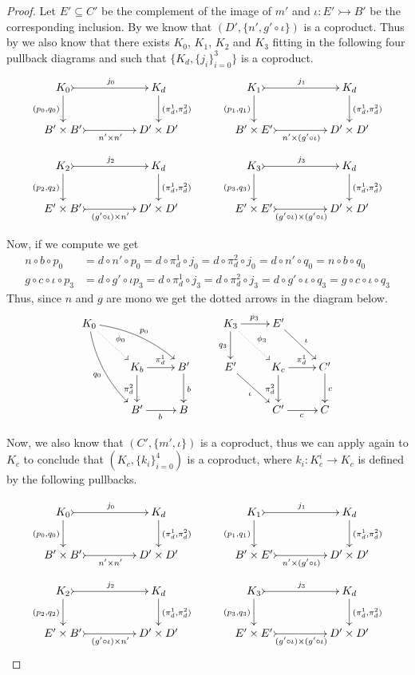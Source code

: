 \documentclass[a4paper,UKenglish,cleveref,pdftex,thm-restate,numberwithinsect]{lipics-v2021}
\newcommand{\mto}{\rightarrowtail}
\begin{document}
\begin{proof}
		Let $E'\subseteq C'$ be the complement of the image of $m'$ and $\iota\colon E'\mto B'$ be the corresponding inclusion. By  we know that $(D', \{n', g'\circ \iota\})$ is a coproduct. Thus by  we also know that there exists $K_0$, $K_1$, $K_2$ and $K_3$ fitting in the following four pullback diagrams and such that $\{K_d, \{j_i\}_{i=0}^3\}$ is a coproduct.
	\[\xymatrix@C=45pt{K_0 \ar@{>->}[r]^{j_0}  \ar[d]_{(p_0, q_0)}& K_d   \ar[d]^{(\pi^1_d, \pi^2_d)}& K_1 \ar@{>->}[r]^{j_1}  \ar[d]_{(p_1, q_1)} & K_d \ar[d]^{(\pi^1_d, \pi^2_d)} \\
		B'\times B' \ar@{>->}[r]_-{n'\times n'} & D'\times D' & B'\times E' \ar@{>->}[r]_-{n'\times (g'\circ \iota)} & D'\times D'}\]
	\[ \xymatrix@C=45pt{K_2 \ar@{>->}[r]^{j_2}  \ar[d]_{(p_2, q_2)}& K_d   \ar[d]^{(\pi^1_d, \pi^2_d)}& K_3 \ar@{>->}[r]^{j_3}  \ar[d]_{(p_3, q_3)} & K_d \ar[d]^{(\pi^1_d, \pi^2_d)} \\
		E'\times B' \ar@{>->}[r]_-{(g'\circ \iota) \times n'} & D'\times D' & E'\times E' \ar@{>->}[r]_-{(g'\circ \iota)\times (g'\circ \iota)} & D'\times D'}\]
	
	Now, if we compute we get
	\begin{align*}
		n\circ b\circ p_0&= d\circ n'\circ p_0= d\circ \pi^1_d\circ j_0=d\circ \pi^2_d\circ j_0=d\circ n'\circ q_0=n\circ b\circ q_0\\
g\circ c \circ  \iota \circ p_3&=d\circ g' \circ  \iota p_3=d\circ \pi^1_d\circ j_3=d\circ \pi^2_d\circ j_3=d\circ g'\circ \iota \circ q_3= g \circ c\circ \iota\circ q_3
	\end{align*}
	Thus, since $n$ and $g$ are mono we get the dotted arrows in the diagram below.
\[\xymatrix{K_0 \ar@/^.3cm/[drr]^{p_0} \ar@{.>}[dr]^{\phi_0} \ar@/_.3cm/[ddr]_{q_0} &&& K_3 \ar[r]^{p_3} \ar@{.>}[dr]^{\phi_3} \ar[d]_{q_3}& E' \ar[dr]^{\iota} \\ &K_b \ar[r]^{\pi^1_d} \ar[d]_{\pi^2_d}& B' \ar[d]^{b} & E' \ar[dr]_{\iota}&K_c \ar[r]^{\pi^1_d} \ar[d]_{\pi^2_d} & C'  \ar[d]^{c}\\ & B' \ar[r]_{b} & B && C' \ar[r]_{c} & C }\]
	
	Now, we also know that $(C', \{m', \iota\})$ is a coproduct, thus we can apply again  to $K_c$ to conclude that $(K_c, \{k_i\}_{i=0}^4)$ is a coproduct, where $k_i\colon K^i_c\to K_c$ is defined by the following pullbacks.
	
	\[\xymatrix@C=45pt{K_0 \ar@{>->}[r]^{j_0}  \ar[d]_{(p_0, q_0)}& K_d   \ar[d]^{(\pi^1_d, \pi^2_d)}& K_1 \ar@{>->}[r]^{j_1}  \ar[d]_{(p_1, q_1)} & K_d \ar[d]^{(\pi^1_d, \pi^2_d)} \\
		B'\times B' \ar@{>->}[r]_-{n'\times n'} & D'\times D' & B'\times E' \ar@{>->}[r]_-{n'\times (g'\circ \iota)} & D'\times D'}\]
	\[ \xymatrix@C=45pt{K_2 \ar@{>->}[r]^{j_2}  \ar[d]_{(p_2, q_2)}& K_d   \ar[d]^{(\pi^1_d, \pi^2_d)}& K_3 \ar@{>->}[r]^{j_3}  \ar[d]_{(p_3, q_3)} & K_d \ar[d]^{(\pi^1_d, \pi^2_d)} \\
		E'\times B' \ar@{>->}[r]_-{(g'\circ \iota) \times n'} & D'\times D' & E'\times E' \ar@{>->}[r]_-{(g'\circ \iota)\times (g'\circ \iota)} & D'\times D'}\]
	

\end{proof}
\end{document}
